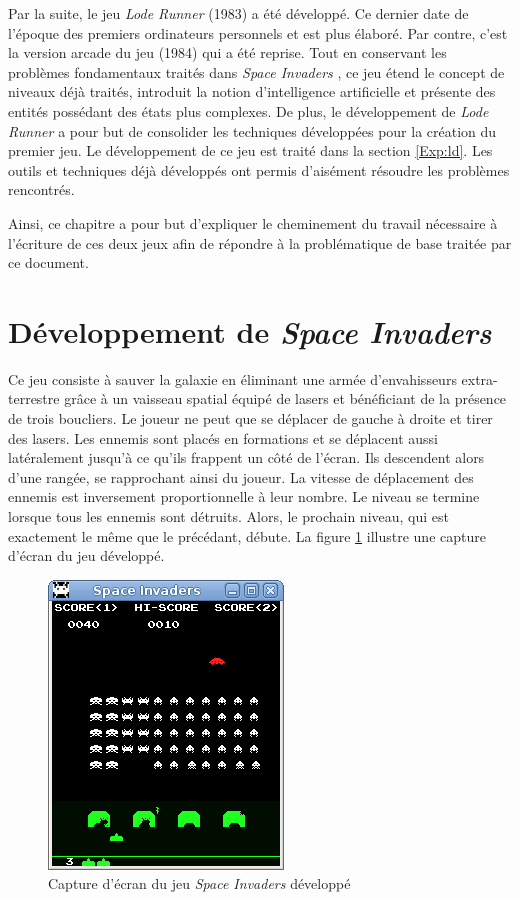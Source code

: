 \documentclass[12pt,twoside,letterpaper,francais]{book}
\newcommand{\lr}{{\textit{Lode Runner }}}
\newcommand{\si}{{\textit{Space Invaders }}}
\begin{document}
Par la suite, le jeu \lr (1983) a été développé. Ce dernier date de
l'époque des premiers ordinateurs personnels et est plus élaboré. Par
contre, c'est la version arcade du jeu (1984) qui a été reprise. Tout
en conservant les problèmes fondamentaux traités dans \si, ce jeu
étend le concept de niveaux déjà traités, introduit la notion
d'intelligence artificielle et présente des entités possédant des
états plus complexes. De plus, le développement de \lr a pour but de
consolider les techniques développées pour la création du premier
jeu. Le développement de ce jeu est traité dans la section
\ref{Exp:ld}.  Les outils et techniques déjà développés ont permis
d'aisément résoudre les problèmes rencontrés.

Ainsi, ce chapitre a pour but d'expliquer le cheminement du travail
nécessaire à l'écriture de ces deux jeux afin de répondre à la
problématique de base traitée par ce document.


\FloatBarrier
\section{Développement de \si} \label{Exp:SI}
Ce jeu consiste à \og sauver la galaxie \fg en éliminant une armée
d'envahisseurs extra-terrestre grâce à un vaisseau spatial équipé de
lasers et bénéficiant de la présence de trois boucliers. Le joueur ne
peut que se déplacer de gauche à droite et tirer des lasers. Les
ennemis sont placés en formations et se déplacent aussi latéralement
jusqu'à ce qu'ils frappent un côté de l'écran. Ils descendent alors
d'une rangée, se rapprochant ainsi du joueur. La vitesse de
déplacement des ennemis est inversement proportionnelle à leur
nombre. Le niveau se termine lorsque tous les ennemis sont
détruits. Alors, le prochain niveau, qui est exactement le même que le
précédant, débute. La figure \ref{Exp:si-screen} illustre une capture
d'écran du jeu développé.\\

\begin{figure}[htb!]
  \center
  \includegraphics[scale=0.7]{space-invaders-screenshot}
  \caption{Capture d'écran du jeu \si développé}
  \label{Exp:si-screen}
\end{figure}
\end{document}
